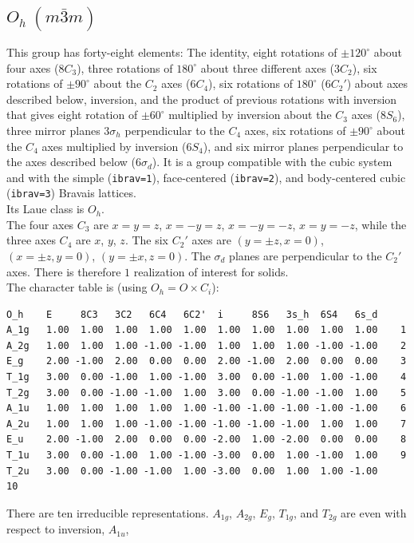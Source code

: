 \documentclass[12pt,a4paper]{article}
\begin{document}
\subsection{\color{web-blue}$O_h\ (m\bar3m)$}   
This group has forty-eight elements: 
The identity, eight rotations of $\pm120^\circ$ about four axes ($8C_3$), 
three rotations of $180^\circ$ about three different axes ($3C_2$), six
rotations of $\pm90^\circ$ about the $C_2$ axes ($6C_4$), 
six rotations of $180^\circ$ ($6C_2'$) about axes described below, 
inversion, and the product of previous rotations with inversion that gives
eight rotation of $\pm60^\circ$ multiplied by inversion about the $C_3$ axes 
($8S_6$), three mirror planes $3\sigma_h$ perpendicular to the $C_4$ axes,
six rotations of $\pm90^\circ$ about the $C_4$ axes multiplied by inversion
($6S_4$), and six mirror planes perpendicular to the axes described
below ($6\sigma_d$). It is a group compatible with the cubic system and with the  
simple (\texttt{ibrav=1}), face-centered (\texttt{ibrav=2}), 
and body-centered cubic (\texttt{ibrav=3}) Bravais lattices. \\
Its Laue class is $O_{h}$. \\
The four axes $C_3$ are $x=y=z$, $x=-y=z$, $x=-y=-z$, $x=y=-z$, while
the three axes $C_4$ are $x$, $y$, $z$. 
The six $C_2'$ axes are $(y=\pm z, x=0)$, $(x=\pm z, y=0)$, $(y=\pm x, z=0)$.
The $\sigma_d$ planes are perpendicular to the $C_2'$ axes.
There is therefore $1$ realization of interest for solids. \\
The character table is (using $O_h=O \times C_i$):
\begin{verbatim}
O_h    E     8C3   3C2   6C4   6C2'  i     8S6   3s_h  6S4   6s_d 
A_1g   1.00  1.00  1.00  1.00  1.00  1.00  1.00  1.00  1.00  1.00    1
A_2g   1.00  1.00  1.00 -1.00 -1.00  1.00  1.00  1.00 -1.00 -1.00    2
E_g    2.00 -1.00  2.00  0.00  0.00  2.00 -1.00  2.00  0.00  0.00    3
T_1g   3.00  0.00 -1.00  1.00 -1.00  3.00  0.00 -1.00  1.00 -1.00    4
T_2g   3.00  0.00 -1.00 -1.00  1.00  3.00  0.00 -1.00 -1.00  1.00    5
A_1u   1.00  1.00  1.00  1.00  1.00 -1.00 -1.00 -1.00 -1.00 -1.00    6
A_2u   1.00  1.00  1.00 -1.00 -1.00 -1.00 -1.00 -1.00  1.00  1.00    7
E_u    2.00 -1.00  2.00  0.00  0.00 -2.00  1.00 -2.00  0.00  0.00    8
T_1u   3.00  0.00 -1.00  1.00 -1.00 -3.00  0.00  1.00 -1.00  1.00    9
T_2u   3.00  0.00 -1.00 -1.00  1.00 -3.00  0.00  1.00  1.00 -1.00    10
\end{verbatim}
There are ten irreducible representations. $A_{1g}$, $A_{2g}$, $E_g$,
$T_{1g}$, and $T_{2g}$ are even with respect to inversion, $A_{1u}$, 
\end{document}
